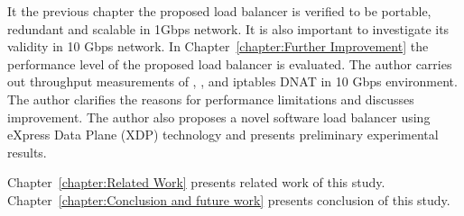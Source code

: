 It the previous chapter the proposed load balancer is verified to be portable, redundant and scalable in 1Gbps network.
It is also important to investigate its validity in 10 Gbps network.
In Chapter~\ref{chapter:Further Improvement} the performance level of the proposed load balancer is evaluated.
The author carries out throughput measurements of , , and iptables DNAT in 10 Gbps environment.
The author clarifies the reasons for performance limitations and discusses improvement.
The author also proposes a novel software load balancer using eXpress Data Plane (XDP) technology and presents preliminary experimental results.

Chapter~\ref{chapter:Related Work} presents related work of this study.
%
Chapter~\ref{chapter:Conclusion and future work} presents conclusion of this study.



